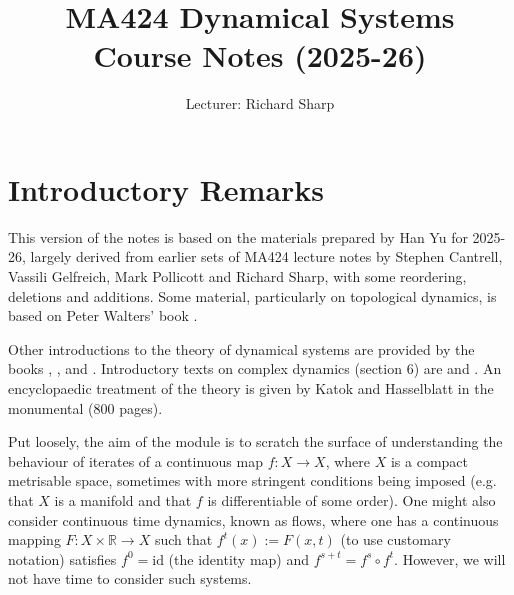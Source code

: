 \documentclass[12pt]{article}
\date{}
\def\myfont{\fontfamily{cmss}\selectfont}
\theoremstyle{definition}
\theoremstyle{remark}
\begin{document}
 
\title{MA424 Dynamical Systems \\ Course Notes (2025-26)}%

\author{Lecturer: Richard Sharp} 








\maketitle

\tableofcontents

\newpage


\setcounter{section}{-1}
\section{Introductory Remarks}
This version of the notes is based on the materials prepared by Han Yu for 2025-26, largely derived
 from earlier sets of MA424 lecture notes by Stephen Cantrell, Vassili Gelfreich, Mark Pollicott and Richard Sharp,
with some reordering, deletions and additions. Some material, particularly on topological
dynamics, is based on 
Peter Walters' book \cite{Walters}.

Other introductions to the theory of dynamical systems are provided by the books
\cite{BS02}, \cite{Dev03}, \cite{HK03} and \cite{Ste10}. 
Introductory texts on complex dynamics (section 6)
are  \cite{Bea91} and \cite{Stein93}.
An encyclopaedic treatment of the theory is given by Katok and Hasselblatt in the monumental \cite{KH95} (800 pages).

Put loosely, the aim of the module is to scratch the surface of understanding the behaviour 
of iterates of a continuous map $f : X \to X$, where $X$ is a compact metrisable space,
sometimes with more stringent conditions being imposed (e.g. that $X$ is a manifold
and that $f$ is differentiable of some order). One might also consider continuous time dynamics,
known as flows, where one has a continuous mapping $F : X \times \mathbb R \to X$
such that $f^t(x) := F(x,t)$ (to use customary notation)
satisfies
$f^0 = \mathrm{id}$ (the identity map) and $f^{s+t} = f^s \circ f^t$. However, we will not have time to consider such systems.
\end{document}
